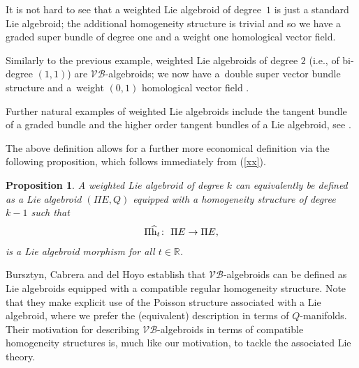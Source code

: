 \documentclass[10pt,a4paper]{amsart}
\newcommand{\rmh}{\textnormal{h}}
\numberwithin{equation}{section}
\newtheorem{Proposition}[Theorem]{Proposition}
 { \theoremstyle{definition}
\newtheorem{Definition}[Theorem]{Definition}
\newtheorem{Example}[Theorem]{Example}
\newtheorem{Remark}[Theorem]{Remark} }
\begin{document}
 \begin{Example}It is not hard to see that a weighted Lie algebroid of degree~$1$ is just a standard Lie algebroid; the additional homogeneity structure is trivial and so we have a graded super bundle of degree one and a weight one homological vector f\/ield.
 \end{Example}

 \begin{Example}
 Similarly to the previous example, weighted Lie algebroids of degree $2$  (i.e., of bi-degree $(1,1)$) are $\mathcal{VB}$-algebroids; we now have a~double super vector bundle structure and a~weight $(0,1)$ homological vector f\/ield \cite{Gracia-Saz:2009}.
 \end{Example}
Further natural examples of weighted Lie algebroids include the tangent bundle of a graded bundle and the higher order tangent bundles of a Lie algebroid, see \cite{Bruce:2014}.

 The above def\/inition allows for a further more economical def\/inition via the following proposition, which follows immediately from (\ref{xx}).

\begin{Proposition}
A weighted Lie algebroid of degree $k$ can equivalently be defined as a Lie algebroid $(\Pi E, Q)$ equipped with a homogeneity structure of degree $k-1$ such that
\begin{gather*}
\Pi  \widehat{\rmh}_{t}\colon \  \Pi E \rightarrow \Pi E,
\end{gather*}
\noindent is a Lie algebroid morphism for all $t \in \mathbb{R}$.
\end{Proposition}

\begin{Remark}
Bursztyn, Cabrera and del Hoyo  \cite[Theorem~3.4.3]{Bursztyn:2014} establish  that $\mathcal{VB}$-algebroids can be def\/ined as Lie algebroids equipped with a compatible regular homogeneity structure. Note that they make explicit use of the Poisson structure associated with a Lie algebroid, where we prefer the (equivalent) description in terms of $Q$-manifolds.  Their motivation  for describing $\mathcal{VB}$-algebroids in terms of compatible homogeneity structures  is, much like our motivation,  to tackle the associated Lie theory.
\end{Remark}
\end{document}
